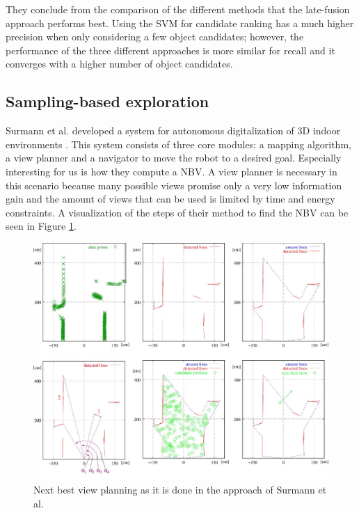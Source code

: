 \documentclass[a4paper,11pt,english]{article}
\begin{document}
They conclude from the comparison of the different methods that the late-fusion approach performs best.
Using the SVM for candidate ranking has a much higher precision when only considering a few object candidates; however, the performance of the three different approaches is more similar for recall and it converges with a higher number of object candidates.

\subsection{Sampling-based exploration}
\label{background:surmann}
Surmann et al. developed a system for autonomous digitalization of 3D indoor environments \cite{surmann2003autonomous}.
This system consists of three core modules: a mapping algorithm, a view planner and a navigator to move the robot to a desired goal.
Especially interesting for us is how they compute a NBV.
A view planner is necessary in this scenario because many possible views promise only a very low information gain and the amount of views that can be used is limited by time and energy constraints.
A visualization of the steps of their method to find the NBV can be seen in Figure \ref{fig:surmann}.

\begin{figure}[h!]
	\begin{center}
		\includegraphics[width=1\textwidth]{src/nbv.png}
		\caption{Next best view planning as it is done in the approach of Surmann et al. \cite{surmann2003autonomous}}
		\label{fig:surmann}
	\end{center}
\end{figure}
\end{document}
